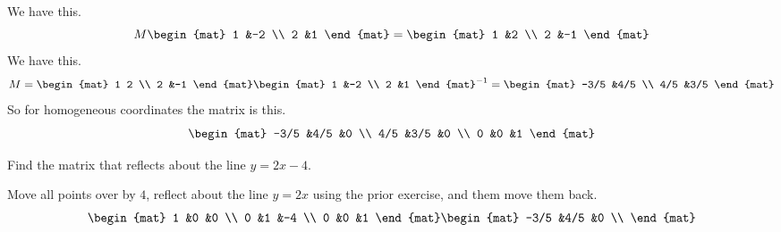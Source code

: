 \begin{exercises}
\begin{answer}
      We have this.
      \begin{equation*}
        M
        \begin{mat}
          1  &-2  \\
          2  &1
        \end{mat}
        =
        \begin{mat}
          1  &2  \\
          2  &-1
        \end{mat}
      \end{equation*}
      We have this.
      \begin{equation*}
        M =
            \begin{mat}
              1  2  \\
              2  &-1
            \end{mat}
            \begin{mat}
              1  &-2  \\
              2  &1     
            \end{mat}^{-1}
          =
            \begin{mat}
              -3/5  &4/5 \\
              4/5   &3/5
            \end{mat}
      \end{equation*}
      So for homogeneous coordinates the matrix is this.
      \begin{equation*}
      \begin{mat}
        -3/5  &4/5  &0  \\
         4/5  &3/5  &0  \\
           0  &0    &1
      \end{mat}
      \end{equation*}
    \end{answer}
  \item Find the matrix that reflects about the line $y=2x-4$.
    \begin{answer}
      Move all points over by $4$, reflect about the line $y=2x$ using the
      prior exercise, and them move them back. 
      \begin{equation*}
      \begin{mat}
        1  &0  &0  \\
        0  &1  &-4 \\
        0  &0  &1
      \end{mat}
      \begin{mat}
        -3/5  &4/5  &0  \\

\end{mat}
\end{equation*}
\end{answer}
\end{exercises}
